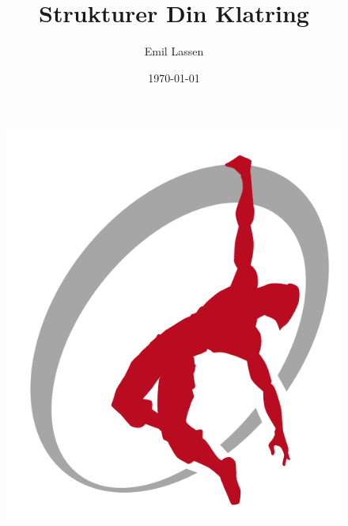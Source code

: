 \documentclass[12pt,a4paper]{article}
\title{\sc Strukturer Din Klatring}
\author{Emil Lassen}
\date{\today}
\begin{document}
\maketitle
\vfill
\begin{figure}[h!]
  \raggedleft
  \includegraphics[width=.6\textwidth]{figs/aak}
\end{figure}
\clearpage


\clearpage


\clearpage


\clearpage


\clearpage


\end{document}
